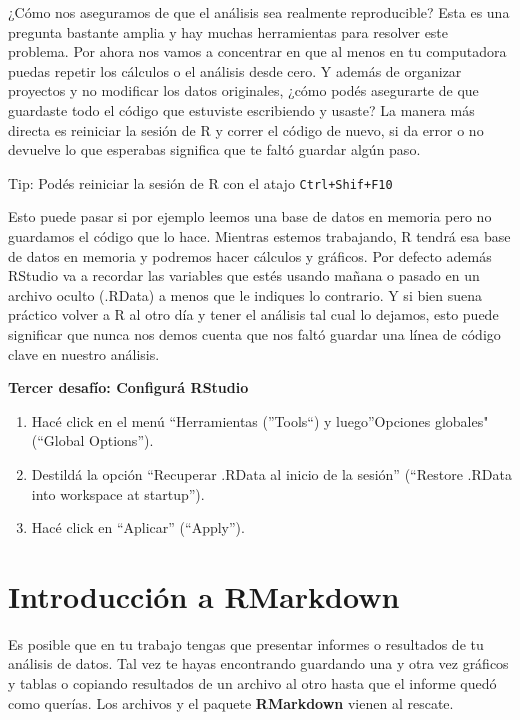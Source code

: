 \documentclass[
  openany]{book}
\providecommand{\tightlist}{%
  \setlength{\itemsep}{0pt}\setlength{\parskip}{0pt}}
\begin{document}
¿Cómo nos aseguramos de que el análisis sea realmente reproducible?
Esta es una pregunta bastante amplia y hay muchas herramientas para resolver este problema.
Por ahora nos vamos a concentrar en que al menos en tu computadora puedas repetir los cálculos o el análisis desde cero.
Y además de organizar proyectos y no modificar los datos originales, ¿cómo podés asegurarte de que guardaste todo el código que estuviste escribiendo y usaste?
La manera más directa es reiniciar la sesión de R y correr el código de nuevo, si da error o no devuelve lo que esperabas significa que te faltó guardar algún paso.

Tip: Podés reiniciar la sesión de R con el atajo \texttt{Ctrl+Shif+F10}

Esto puede pasar si por ejemplo leemos una base de datos en memoria pero no guardamos el código que lo hace.
Mientras estemos trabajando, R tendrá esa base de datos en memoria y podremos hacer cálculos y gráficos.
Por defecto además RStudio va a recordar las variables que estés usando mañana o pasado en un archivo oculto (.RData) a menos que le indiques lo contrario.
Y si bien suena práctico volver a R al otro día y tener el análisis tal cual lo dejamos, esto puede significar que nunca nos demos cuenta que nos faltó guardar una línea de código clave en nuestro análisis.

\textbf{Tercer desafío: Configurá RStudio}

\begin{enumerate}
\def\labelenumi{\arabic{enumi}.}
\tightlist
\item
  Hacé click en el menú ``Herramientas (''Tools``) y luego''Opciones globales" (``Global Options'').
\item
  Destildá la opción ``Recuperar .RData al inicio de la sesión'' (``Restore .RData into workspace at startup'').
\item
  Hacé click en ``Aplicar'' (``Apply'').
\end{enumerate}

\hypertarget{introducciuxf3n-a-rmarkdown}{%
\chapter{Introducción a RMarkdown}\label{introducciuxf3n-a-rmarkdown}}

Es posible que en tu trabajo tengas que presentar informes o resultados de tu análisis de datos.
Tal vez te hayas encontrando guardando una y otra vez gráficos y tablas o copiando resultados de un archivo al otro hasta que el informe quedó como querías.
Los archivos y el paquete \textbf{RMarkdown} vienen al rescate.
\end{document}
